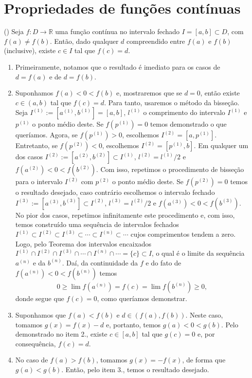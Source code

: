 \section{Propriedades de funções contínuas}\label{cap_continuidade_sec_prop_f_cont}

\begin{teo}()\label{teo:valor_intermediario}
  Seja $f:D\to\mathbb{R}$ uma função contínua no intervalo fechado $I=[a, b]\subset D$, com $f(a)\neq f(b)$. Então, dado qualquer $d$ compreendido entre $f(a)$ e $f(b)$ (inclusive), existe $c\in I$ tal que $f(c)=d$.
\end{teo}
\begin{dem}
  \begin{enumerate}
  \item Primeiramente, notamos que o resultado é imediato para os casos de $d=f(a)$ e de $d=f(b)$.
  \item Suponhamos $f(a) < 0 < f(b)$ e, mostraremos que se $d=0$, então existe $c\in (a, b)$ tal que $f(c)=d$. Para tanto, usaremos o método da bisseção. Seja $I^{(1)}:=[a^{(1)}, b^{(1)}]=[a, b]$, $l^{(1)}$ o comprimento do intervalo $I^{(1)}$ e $p^{(1)}$ o ponto médio deste. Se $f(p^{(1)})=0$ temos demonstrado o que queríamos. Agora, se $f(p^{(1)})>0$, escolhemos $I^{(2)}=[a, p^{(1)}]$. Entretanto, se $f(p^{(2)}) < 0$, escolhemos $I^{(2)} = [p^{(1)}, b]$. Em qualquer um dos casos $I^{(2)}:=[a^{(2)}, b^{(2)}]\subset I^{(1)}$, $l^{(2)} = l^{(1)}/2$ e $f(a^{(2)}) < 0 < f(b^{(2)})$. Com isso, repetimos o procedimento de bisseção para o intervalo $I^{(2)}$ com $p^{(2)}$ o ponto médio deste. Se $f(p^{(2)})=0$ temos o resultado desejado, caso contrário escolhemos o intervalo fechado $I^{(3)}:=[a^{(3)}, b^{(3)}]\subset I^{(2)}$, $l^{(3)}=l^{(2)}/2$ e $f(a^{(3)}) < 0 < f(b^{(3)})$. No pior dos casos, repetimos infinitamente este procedimento e, com isso, temos construído uma sequência de intervalos fechados $I^{(1)}\subset I^{(2)}\subset I^{(3)} \subset \cdots \subset I^{(n)} \subset \cdots$ cujos comprimentos tendem a zero. Logo, pelo Teorema dos intervalos encaixados $I^{(1)}\cap I^{(2)}\cap I^{(3)}\cap \cdots \cap I^{(n)}\cap \cdots = \{c\} \subset I$, o qual é o limite da sequência $a^{(n)}$ e da $b^{(n)}$. Daí, da continuidade da $f$ e do fato de $f(a^{(n)}) < 0 < f(b^{(n)})$ temos
  \begin{equation}
    0 \geq \lim f(a^{(n)}) = f(c) = \lim f(b^{(n)}) \geq 0,
  \end{equation}
donde segue que $f(c)=0$, como queríamos demonstrar.
  \item Suponhamos que $f(a) < f(b)$ e $d\in (f(a), f(b))$. Neste caso, tomamos $g(x) = f(x)-d$ e, portanto, temos $g(a) < 0 < g(b)$. Pelo demonstrado no item 2., existe $c\in [a, b]$ tal que $g(c)=0$ e, por consequência, $f(c)=d$.
  \item No caso de $f(a) > f(b)$, tomamos $g(x) = -f(x)$, de forma que $g(a) < g(b)$. Então, pelo item 3., temos o resultado desejado.
  \end{enumerate}
\end{dem}

